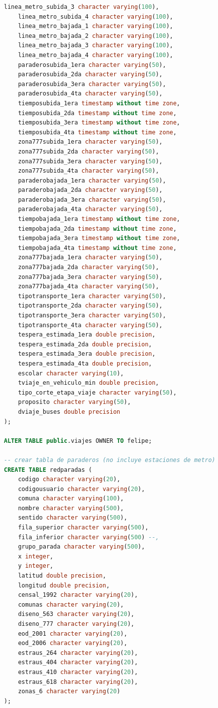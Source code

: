 \documentclass[12pt]{article}
\begin{document}
\begin{lstlisting}[breaklines=true, 
				   language=SQL,  
				   title=asd, 
				   caption=Instalacion de postgres,
				   label=fig:instalar_postgres]
    linea_metro_subida_3 character varying(100),
    linea_metro_subida_4 character varying(100),
    linea_metro_bajada_1 character varying(100),
    linea_metro_bajada_2 character varying(100),
    linea_metro_bajada_3 character varying(100),
    linea_metro_bajada_4 character varying(100),
    paraderosubida_1era character varying(50),
    paraderosubida_2da character varying(50),
    paraderosubida_3era character varying(50),
    paraderosubida_4ta character varying(50),
    tiemposubida_1era timestamp without time zone,
    tiemposubida_2da timestamp without time zone,
    tiemposubida_3era timestamp without time zone,
    tiemposubida_4ta timestamp without time zone,
    zona777subida_1era character varying(50),
    zona777subida_2da character varying(50),
    zona777subida_3era character varying(50),
    zona777subida_4ta character varying(50),
    paraderobajada_1era character varying(50),
    paraderobajada_2da character varying(50),
    paraderobajada_3era character varying(50),
    paraderobajada_4ta character varying(50),
    tiempobajada_1era timestamp without time zone,
    tiempobajada_2da timestamp without time zone,
    tiempobajada_3era timestamp without time zone,
    tiempobajada_4ta timestamp without time zone,
    zona777bajada_1era character varying(50),
    zona777bajada_2da character varying(50),
    zona777bajada_3era character varying(50),
    zona777bajada_4ta character varying(50),
    tipotransporte_1era character varying(50),
    tipotransporte_2da character varying(50),
    tipotransporte_3era character varying(50),
    tipotransporte_4ta character varying(50),
    tespera_estimada_1era double precision,
    tespera_estimada_2da double precision,
    tespera_estimada_3era double precision,
    tespera_estimada_4ta double precision,
    escolar character varying(10),
    tviaje_en_vehiculo_min double precision,
    tipo_corte_etapa_viaje character varying(50),
    proposito character varying(50),
    dviaje_buses double precision
);

ALTER TABLE public.viajes OWNER TO felipe;

-- crear tabla de paraderos (no incluye estaciones de metro)
CREATE TABLE redparadas (
    codigo character varying(20),
    codigousuario character varying(20),
    comuna character varying(100),
    nombre character varying(500),
    sentido character varying(500),
    fila_superior character varying(500),
    fila_inferior character varying(500) --,
    grupo_parada character varying(500),
    x integer,
    y integer,
    latitud double precision,
    longitud double precision,
    censal_1992 character varying(20),
    comunas character varying(20),
    diseno_563 character varying(20),
    diseno_777 character varying(20),
    eod_2001 character varying(20),
    eod_2006 character varying(20),
    estraus_264 character varying(20),
    estraus_404 character varying(20),
    estraus_410 character varying(20),
    estraus_618 character varying(20),
    zonas_6 character varying(20)
);


\end{lstlisting}
\end{document}

